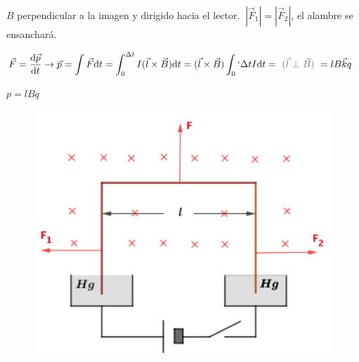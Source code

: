 \begin{multicols}{2}
$B$ perpendicular a la imagen y dirigido hacia el lector.
$\ |\vec F_1|=|\vec F_2|$, el alambre se ensanchará.

$\vec F=\displaystyle \dv{\vec p}{t} \to \vec p=\int \vec F \dd t= \int_0^{\Delta t} I(\vec l \times \vec B)\dd t=(\vec l \times \vec B) \int_0`{\Delta t} I \dd t = \textcolor{gris}{ \ (\vec l \ \bot \ \vec B) \ }= l B \vec k q$

$p=lBq$
\begin{figure}[H]
	\centering
	\includegraphics[width=.5\textwidth]{imagenes/imagenes26/T26IM21.png}
	\end{figure}	
\end{multicols}
	
